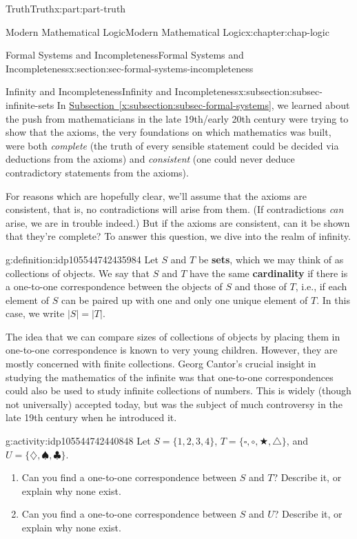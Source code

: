\documentclass[oneside,10pt,]{book}
\newcommand{\xreffont}{\relax}
\newcommand{\terminology}[1]{\textbf{#1}}
\numberwithin{equation}{section}
\begin{document}
\begin{partptx}{Truth}{}{Truth}{}{}{x:part:part-truth}
\begin{chapterptx}{Modern Mathematical Logic}{}{Modern Mathematical Logic}{}{}{x:chapter:chap-logic}
\begin{sectionptx}{Formal Systems and Incompleteness}{}{Formal Systems and Incompleteness}{}{}{x:section:sec-formal-systems-incompleteness}
%
\begin{subsectionptx}{Infinity and Incompleteness}{}{Infinity and Incompleteness}{}{}{x:subsection:subsec-infinite-sets}
In \hyperref[x:subsection:subsec-formal-systems]{Subsection~{\xreffont\ref{x:subsection:subsec-formal-systems}}}, we learned about the push from mathematicians in the late 19th\slash{}early 20th century were trying to show that the axioms, the very foundations on which mathematics was built, were both \emph{complete} (the truth of every sensible statement could be decided via deductions from the axioms) and \emph{consistent} (one could never deduce contradictory statements from the axioms).%
\par
For reasons which are hopefully clear, we'll assume that the axioms are consistent, that is, no contradictions will arise from them. (If contradictions \emph{can} arise, we are in trouble indeed.) But if the axioms are consistent, can it be shown that they're complete? To answer this question, we dive into the realm of infinity.%
\begin{definition}{}{g:definition:idp105544742435984}%
Let \(S\) and \(T\) be \terminology{sets}, which we may think of as collections of objects. We say that \(S\) and \(T\) have the same \terminology{cardinality} if there is a one-to-one correspondence between the objects of \(S\) and those of \(T\), i.e., if each element of \(S\) can be paired up with one and only one unique element of \(T\). In this case, we write \(|S| = |T|\).%
\end{definition}
The idea that we can compare sizes of collections of objects by placing them in one-to-one correspondence is known to very young children. However, they are mostly concerned with finite collections. Georg Cantor's crucial insight in studying the mathematics of the infinite was that one-to-one correspondences could also be used to study infinite collections of numbers. This is widely (though not universally) accepted today, but was the subject of much controversy in the late 19th century when he introduced it.%
\begin{activity}{}{g:activity:idp105544742440848}%
Let \(S = \{1,2,3,4\}\), \(T=\{\square,\circ,\bigstar,\triangle\}\), and \(U = \{\diamondsuit,\spadesuit,\clubsuit\}\).%
%
\begin{enumerate}
\item{}Can you find a one-to-one correspondence between \(S\) and \(T\)? Describe it, or explain why none exist.%
\item{}Can you find a one-to-one correspondence between \(S\) and \(U\)? Describe it, or explain why none exist.%

\end{enumerate}
\end{activity}
\end{subsectionptx}
\end{sectionptx}
\end{chapterptx}
\end{partptx}
\end{document}
